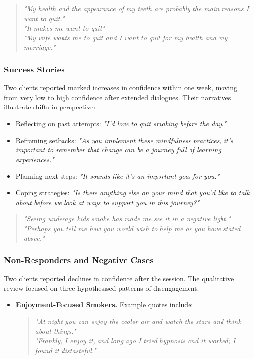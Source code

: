 \begin{quote}
\emph{"My health and the appearance of my teeth are probably the main reasons I want to quit."} \\
\emph{"It makes me want to quit"} \\
\emph{"My wife wants me to quit and I want to quit for my health and my marriage."}
\end{quote}

\subsubsection*{Success Stories}

Two clients reported marked increases in confidence within one week, moving from very low to high confidence after extended dialogues. Their narratives illustrate shifts in perspective:
\begin{itemize}
    \item Reflecting on past attempts: \emph{"I'd love to quit smoking before the day."}
    \item Reframing setbacks: \emph{"As you implement these mindfulness practices, it's important to remember that change can be a journey full of learning experiences."}
    \item Planning next steps: \emph{"It sounds like it's an important goal for you."}
    \item Coping strategies: \emph{"Is there anything else on your mind that you'd like to talk about before we look at ways to support you in this journey?"}
\end{itemize}

\begin{quote}
\emph{"Seeing underage kids smoke has made me see it in a negative light."} \\
\emph{"Perhaps you tell me how you would wish to help me as you have stated above."}
\end{quote}

\subsubsection*{Non-Responders and Negative Cases}

Two clients reported declines in confidence after the session. The qualitative review focused on three hypothesised patterns of disengagement:
\begin{itemize}

    \item \textbf{Enjoyment-Focused Smokers.} Example quotes include:
    \begin{quote}
    \emph{"At night you can enjoy the cooler air and watch the stars and think about things."} \\
    \emph{"Frankly, I enjoy it, and long ago I tried hypnosis and it worked; I found it distasteful."}
    \end{quote}
\end{itemize}


